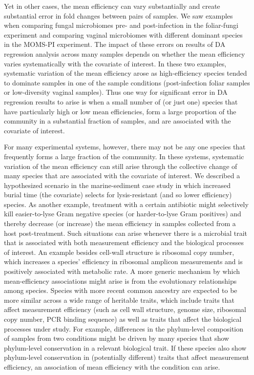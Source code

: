 \documentclass[
]{article}
\begin{document}
Yet in other cases, the mean efficiency can vary substantially and create substantial error in fold changes between pairs of samples.
We saw examples when comparing fungal microbiomes pre- and post-infection in the foliar-fungi experiment and comparing vaginal microbiomes with different dominant species in the MOMS-PI experiment.
The impact of these errors on results of DA regression analysis across many samples depends on whether the mean efficiency varies systematically with the covariate of interest.
In these two examples, systematic variation of the mean efficiency arose as high-efficiency species tended to dominate samples in one of the sample conditions (post-infection foliar samples or low-diversity vaginal samples).
Thus one way for significant error in DA regression results to arise is when a small number of (or just one) species that have particularly high or low mean efficiencies, form a large proportion of the community in a substantial fraction of samples, and are associated with the covariate of interest.

For many experimental systems, however, there may not be any one species that frequently forms a large fraction of the community.
In these systems, systematic variation of the mean efficiency can still arise through the collective change of many species that are associated with the covariate of interest.
We described a hypothesized scenario in the marine-sediment case study in which increased burial time (the covariate) selects for lysis-resistant (and so lower efficiency) species.
As another example, treatment with a certain antibiotic might selectively kill easier-to-lyse Gram negative species (or harder-to-lyse Gram positives) and thereby decrease (or increase) the mean efficiency in samples collected from a host post-treatment.
Such situations can arise whenever there is a microbial trait that is associated with both measurement efficiency and the biological processes of interest.
An example besides cell-wall structure is ribosomal copy number, which increases a species' efficiency in ribosomal amplicon measurements and is positively associated with metabolic rate.
A more generic mechanism by which mean-efficiency associations might arise is from the evolutionary relationships among species.
Species with more recent common ancestry are expected to be more similar across a wide range of heritable traits, which include traits that affect measurement efficiency (such as cell wall structure, genome size, ribosomal copy number, PCR binding sequence) as well as traits that affect the biological processes under study.
For example, differences in the phylum-level composition of samples from two conditions might be driven by many species that show phylum-level conservation in a relevant biological trait.
If these species also show phylum-level conservation in (potentially different) traits that affect measurement efficiency, an association of mean efficiency with the condition can arise.
\end{document}

